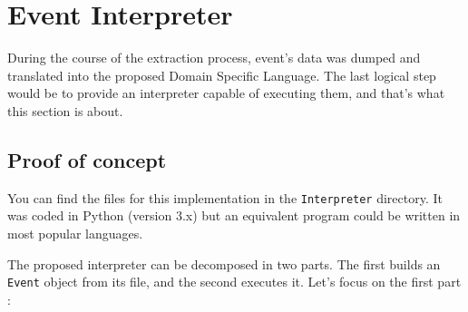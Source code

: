 \documentclass[11pt]{article}
\begin{document}
{\newpage 
\section{Event Interpreter}


During the course of the extraction process, event's data was dumped and translated into the proposed Domain Specific Language. The last logical step would be to provide an interpreter capable of executing them, and that's what this section is about.

\subsection{Proof of concept}

You can find the files for this implementation in the \texttt{Interpreter} directory. It was coded in Python (version 3.x) but an equivalent program could be written in most popular languages.

The proposed interpreter can be decomposed in two parts. The first builds an \texttt{Event} object from its file, and the second executes it. Let's focus on the first part :

}
\end{document}
